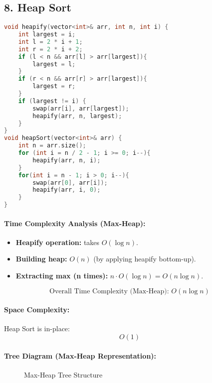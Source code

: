 \subsection*{\textbf{8. Heap Sort}}
\begin{lstlisting}[language=C++, caption=Heap Sort]
void heapify(vector<int>& arr, int n, int i) {
    int largest = i;
    int l = 2 * i + 1;
    int r = 2 * i + 2;
    if (l < n && arr[l] > arr[largest]){
        largest = l;
    }
    if (r < n && arr[r] > arr[largest]){
        largest = r;
    }
    if (largest != i) {
        swap(arr[i], arr[largest]);
        heapify(arr, n, largest);
    }
}
void heapSort(vector<int>& arr) {
    int n = arr.size();
    for (int i = n / 2 - 1; i >= 0; i--){
        heapify(arr, n, i);
    }
    for(int i = n - 1; i > 0; i--){
        swap(arr[0], arr[i]);
        heapify(arr, i, 0);
    }
}
\end{lstlisting}

\paragraph{Time Complexity Analysis (Max-Heap):}

\begin{itemize}
  \item \textbf{Heapify operation:} takes \( O(\log n) \).
  \item \textbf{Building heap:} \( O(n) \) (by applying heapify bottom-up).
  \item \textbf{Extracting max (n times):} \( n \cdot O(\log n) = O(n \log n) \).
\end{itemize}

\[
\boxed{\text{Overall Time Complexity (Max-Heap): } O(n \log n)}
\]

\paragraph{Space Complexity:}
Heap Sort is in-place:
\[
\boxed{O(1)}
\]

\paragraph{Tree Diagram (Max-Heap Representation):}

\begin{figure}[H]
\centering
{}
\caption{Max-Heap Tree Structure}
\end{figure}

